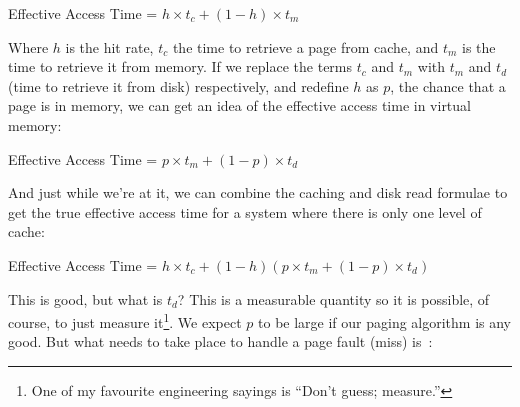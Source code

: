 \begin{center}
	Effective Access Time = $ h \times t_{c} + (1 - h) \times t_{m}$
\end{center}

Where $h$ is the hit rate, $t_{c}$ the time to retrieve a page from cache, and $t_{m}$ is the time to retrieve it from memory. If we replace the terms $t_{c}$ and $t_{m}$ with $t_{m}$ and $t_{d}$ (time to retrieve it from disk) respectively, and redefine $h$ as $p$, the chance that a page is in memory, we can get an idea of the effective access time in virtual memory: 

\begin{center}
	Effective Access Time = $ p \times t_{m} + (1 - p) \times t_{d}$
\end{center}

And just while we're at it, we can combine the caching and disk read formulae to get the true effective access time for a system where there is only one level of cache:

\begin{center}
	Effective Access Time = $ h \times t_{c} + (1 - h) ( p \times t_{m} + (1 - p) \times t_{d})$
\end{center}

This is good, but what is $t_{d}$? This is a measurable quantity so it is possible, of course, to just measure it\footnote{One of my favourite engineering sayings is ``Don't guess; measure.''}. We expect $p$ to be large if our paging algorithm is any good. But what needs to take place to handle a page fault (miss) is~\cite{osc}:

